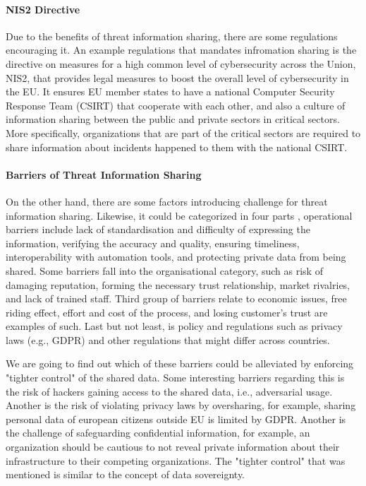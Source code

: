 \documentclass{article}
\begin{document}
\paragraph{NIS2 Directive}
Due to the benefits of threat information sharing, there are some regulations encouraging it.
An example regulations that mandates infromation sharing is the directive on measures for a high common level of cybersecurity across the Union, NIS2, that provides legal measures to boost the overall level of cybersecurity in the EU. It ensures EU member states to have a national Computer Security Response Team (CSIRT) that cooperate with each other, and also a culture of information sharing between the public and private sectors in critical sectors. More specifically, organizations that are part of the critical sectors are required to share information about incidents happened to them with the national CSIRT.

\paragraph*{Barriers of Threat Information Sharing}
On the other hand, there are some factors introducing challenge for threat information sharing. Likewise, it could be categorized in four parts \cite{zibak_cyber_2019}, operational barriers include lack of standardisation and difficulty of expressing the information, verifying the accuracy and quality, ensuring timeliness, interoperability with automation tools, and protecting private data from being shared. Some barriers fall into the organisational category, such as risk of damaging reputation, forming the necessary trust relationship, market rivalries, and lack of trained staff. Third group of barriers relate to economic issues, free riding effect, effort and cost of the process, and losing customer's trust are examples of such. Last but not least, is policy and regulations such as privacy laws (e.g., GDPR) and other regulations that might differ across countries.

We are going to find out which of these barriers could be alleviated by enforcing "tighter control" of the shared data. Some interesting barriers regarding this is the risk of hackers gaining access to the shared data, i.e., adversarial usage. Another is the risk of violating privacy laws by oversharing, for example, sharing personal data of european citizens outside EU is limited by GDPR. Another is the challenge of safeguarding confidential information, for example, an organization should be cautious to not reveal private information about their infrastructure to their competing organizations. The "tighter control" that was mentioned is similar to the concept of data sovereignty.
\end{document}
